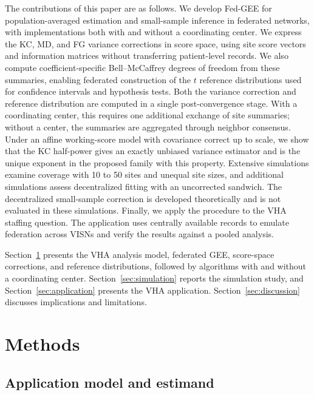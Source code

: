 \documentclass[12pt]{article}
\theoremstyle{remark}
\begin{document}
The contributions of this paper are as follows. We develop Fed-GEE for
population-averaged estimation and small-sample inference in federated networks,
with implementations both with and without a coordinating center. We express
the KC, MD, and FG variance corrections in score space, using site score
vectors and information matrices without transferring patient-level records.
We also compute coefficient-specific Bell--McCaffrey degrees of freedom from
these summaries, enabling federated construction of the $t$ reference
distributions used for confidence intervals and hypothesis tests. Both the
variance correction and reference distribution are computed in a single
post-convergence stage. With a coordinating center, this requires one additional
exchange of site summaries; without a center, the summaries are aggregated
through neighbor consensus. Under an
affine working-score model with covariance correct up to scale, we show that
the KC half-power gives an exactly unbiased variance estimator and is the
unique exponent in the proposed family with this property. Extensive
simulations examine coverage with 10 to 50 sites and unequal site sizes, and
additional simulations assess decentralized fitting with an uncorrected
sandwich. The decentralized small-sample correction is developed theoretically
and is not evaluated in these simulations.
Finally, we apply the procedure to the VHA staffing question. The application
uses centrally available records to emulate federation across VISNs and verify
the results against a pooled analysis.

Section~\ref{sec:methods} presents the VHA analysis model, federated GEE,
score-space corrections, and reference distributions, followed by algorithms
with and without a coordinating center. Section~\ref{sec:simulation} reports
the simulation study, and Section~\ref{sec:application} presents the VHA
application. Section~\ref{sec:discussion} discusses implications and limitations.

\section{Methods}
\label{sec:methods}

\subsection{Application model and estimand}
\label{sec:data}
\end{document}

